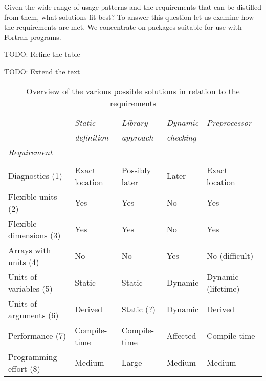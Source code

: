 \documentclass{article}
\begin{document}
Given the wide range of usage patterns and the requirements that can be distilled from them, what solutions fit best?
To answer this question let us examine how the requirements are met. We concentrate on packages suitable for use with Fortran
programs.

TODO: Refine the table

TODO: Extend the text

\begin{table}
\caption{Overview of the various possible solutions in relation to the requirements}
\begin{tabular}{lllll}
                         & \emph{Static}     & \emph{Library}    & \emph{Dynamic}    & \emph{Preprocessor} \\
                         & \emph{definition} & \emph{approach}   & \emph{checking}   &                     \\
\emph{Requirement}       & \cite{UnitsOfMeasureFortran} & \cite{QuaffFortranPackage} & \cite{GrantPettyPhysUnits} & \cite{SimConFPTCheckingUnits} \\
                         &                              &                            &                            & \cite{CamFortCorrectness} \\
\hline
Diagnostics (1)          & Exact location    & Possibly later    & Later             & Exact location      \\
Flexible units (2)       & Yes               & Yes               & No                & Yes                 \\
Flexible dimensions (3)  & Yes               & Yes               & No                & Yes                 \\
Arrays with units (4)    & No                & No                & Yes               & No (difficult)      \\
Units of variables (5)   & Static            & Static            & Dynamic           & Dynamic (lifetime)  \\
Units of arguments (6)   & Derived           & Static (?)        & Dynamic           & Derived             \\
Performance (7)          & Compile-time      & Compile-time      & Affected          & Compile-time        \\
Programming effort (8)   & Medium            & Large             & Medium            & Medium              \\
\end{tabular}
\end{table}
\end{document}
